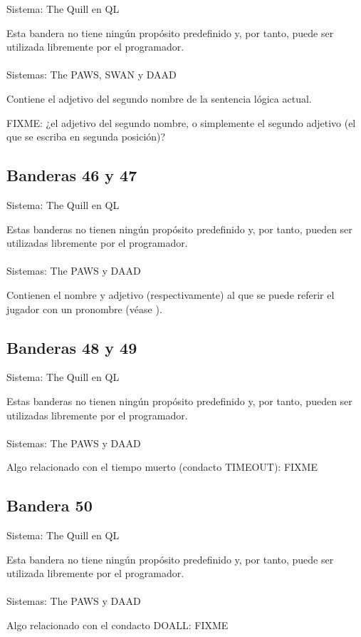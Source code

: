 \documentclass[11pt, a5paper]{article}
\newcommand{\quill}{\textsf{The Quill}\xspace}
\newcommand{\paw}{\textsf{The PAWS}\xspace}
\newcommand{\swan}{\textsf{SWAN}\xspace}
\newcommand{\daad}{\textsf{DAAD}\xspace}
\newcommand{\sistema}[1]{\noindent Sistema: #1 \nopagebreak}
\newcommand{\sistemas}[1]{\noindent Sistemas: #1 \nopagebreak}
\begin{document}
\sistema{\quill en QL}

Esta bandera no tiene ningún propósito predefinido y, por tanto, puede ser utilizada libremente por el programador.
\\\ \\
\sistemas{\paw, \swan y \daad}

Contiene el adjetivo del segundo nombre de la sentencia lógica actual.

FIXME: ¿el adjetivo del segundo nombre, o simplemente el segundo adjetivo (el que se escriba en segunda posición)?

\subsection{Banderas 46 y 47}

\sistema{\quill en QL}

Estas banderas no tienen ningún propósito predefinido y, por tanto, pueden ser utilizadas libremente por el programador.
\\\ \\
\sistemas{\paw y \daad}

Contienen el nombre y adjetivo (respectivamente) al que se puede referir el jugador con un pronombre (véase \textbf{}).

\subsection{Banderas 48 y 49}

\sistema{\quill en QL}

Estas banderas no tienen ningún propósito predefinido y, por tanto, pueden ser utilizadas libremente por el programador.
\\\ \\
\sistemas{\paw y \daad}

Algo relacionado con el tiempo muerto (condacto TIMEOUT): FIXME

\subsection{Bandera 50}

\sistema{\quill en QL}

Esta bandera no tiene ningún propósito predefinido y, por tanto, puede ser utilizada libremente por el programador.
\\\ \\
\sistemas{\paw y \daad}

Algo relacionado con el condacto DOALL: FIXME
\end{document}
